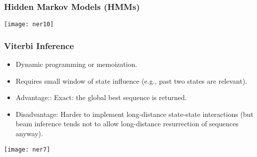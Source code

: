 \begin{frame}[fragile]\frametitle{Hidden Markov Models (HMMs)}
\begin{center}
\texttt{[image: ner10]}
\end{center}
\end{frame}

\begin{frame}[fragile]\frametitle{Viterbi Inference}
  \begin{itemize}
  \item Dynamic programming or memoization.
  \item Requires small window of state influence (e.g., past two states are relevant).
  \item Advantage:: Exact: the global best sequence is returned.
  \item Disadvantage: Harder to implement long-distance state-state interactions (but beam inference tends not
to allow long-distance resurrection of sequences anyway).
  \end{itemize}
\begin{center}
\texttt{[image: ner7]}
\end{center}
\end{frame}



